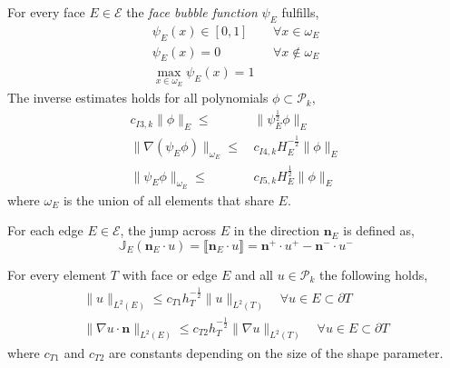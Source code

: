 \begin{definition} \label{def:bubble_est_edge}
For every face $E \in \mathcal{E}$ the \textit{face bubble function } $\psi_E$ fulfills,
\begin{align*}
\psi_E(x) \in [0,1] \quad & \, \forall x \in \omega_E \\
\psi_E(x) = 0 \quad  & \, \forall x \notin \omega_E \\
\max_{x \in \omega_E} \psi_E(x) = 1 
\end{align*}
The inverse estimates holds for all polynomials $\phi \subset \mathcal{P}_k$,
\begin{align*}
c_{I3,k}\|\phi \|_E \leq & \, \|\psi_E^{\frac{1}{2}}\phi\|_E \\
\|\nabla(\psi_E\phi) \|_{\omega_E} \leq & \, c_{I4,k}H_E^{-\frac{1}{2}}\|\phi\|_E \\
\|\psi_E\phi \|_{\omega_E} \leq & \, c_{I5,k}H_E^{\frac{1}{2}}\|\phi\|_E 
\end{align*}
where $\omega_E$ is the union of all elements that share $E$.
\end{definition}

\begin{definition} \label{def:jump}
For each edge $E \in \mathcal{E}$, the jump across $E$ in the direction $\mathbf{n}_E$ is defined as,
\begin{equation}
\mathbb{J}_E(\mathbf{n}_E \cdot u) = \llbracket \mathbf{n}_E\cdot u \rrbracket =  \mathbf{n}^+ \cdot u ^+ - \mathbf{n}^- \cdot u ^-
\end{equation}
\end{definition}

\begin{theorem}\label{def:trace}
For every element $T$ with face or edge $E$ and all $u \in \mathcal{P}_k$ the following holds,
\begin{align*}
\|u\|_{L^2(E)} \leq c_{T1} h_T^{-\frac{1}{2}}\|u\|_{L^2(T)} \quad \forall u \in E \subset \partial T \\
\|\nabla u \cdot \mathbf{n}\|_{L^2(E)} \leq c_{T2} h_T^{-\frac{1}{2}}\|\nabla u\|_{L^2(T)} \quad \forall u \in E \subset \partial T
\end{align*}
where $c_{T1}$ and $c_{T2}$ are constants depending on the size of the shape parameter. 
\end{theorem}